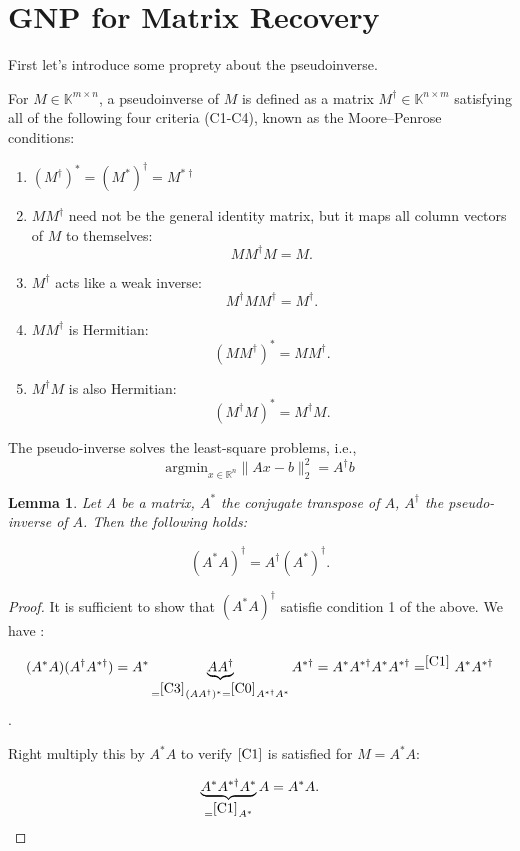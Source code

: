 \documentclass{article}
\newtheorem{lemma}{Lemma}
\newcommand{\pinv}[1]{#1^{\dagger}}
\begin{document}
\section{GNP for Matrix Recovery}
First let's introduce some proprety about the pseudoinverse.

For $M \in \mathbb{K}^{m \times n}$, a pseudoinverse of $M$ is defined as a matrix $M^\dagger \in \mathbb{K}^{n \times m}$ satisfying all of the following four criteria (C1-C4), known as the Moore–Penrose conditions:

\begin{enumerate}[label=c\arabic*),ref=c\arabic*, start=0]
    \item \label{C0} $(\pinv{M})^* = \pinv{(M^*)} = M^{* \dagger}$
    \item \label{C1} \(M\pinv{M}\) need not be the general identity matrix, but it maps all column vectors of \(M\) to themselves:
    \[M\pinv{M}M = M.\]
    
    \item \label{C2} \(\pinv{M}\) acts like a weak inverse:
    \[\pinv{M}M\pinv{M} = \pinv{M}.\]
    
    \item \label{C3} \(M\pinv{M}\) is Hermitian:
    \[(M\pinv{M})^{*} = M\pinv{M}.\]
    
    \item \label{C4} \(\pinv{M}M\) is also Hermitian:
    \[(\pinv{M}M)^{*} = \pinv{M}M.\]
\end{enumerate}
The pseudo-inverse solves the least-square problems, i.e., 
$$
\text{argmin}_{x \in \mathbb{R}^n} \| Ax - b \|_2^2 =A^\dagger b
$$

\begin{lemma}
\label{l1}
Let A be a matrix, $A^*$ the conjugate transpose of $A$, $A^\dagger$ the pseudo-inverse of $A$. Then the following holds:

$$
(A^* A)^\dagger = A^\dagger (A^*)^\dagger.
$$
\end{lemma}

\begin{proof}
It is sufficient to show that $(A^* A)^\dagger$ satisfie condition 1 of the above. We have :

$$
(A^* A) (A^\dagger A^{* \dagger} ) = A^* \underbrace{A A^{\dagger}}_{=^{\ref{C3}}(AA^{\dagger})^* =^{\ref{C0}} A^{* \dagger} A^* } A^{* \dagger}  = A^* A^{* \dagger} A^* A^{* \dagger}  = ^{\ref{C1}} A^* {A^{* \dagger}}
$$.


Right multiply this by $A^* A$ to verify $\ref{C1}$ is satisfied for $M=A^* A$:

$$
 \underbrace{A^* A^{* \dagger} A^*}_{=^{\ref{C1}} A^*} A = A^* A. 
$$
\end{proof}
\end{document}
